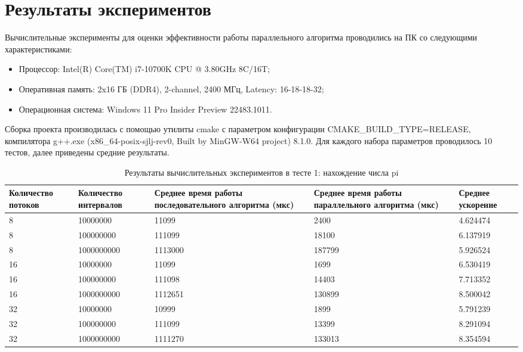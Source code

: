 \documentclass{report}
\begin{document}
\section*{Результаты экспериментов}
\par Вычислительные эксперименты для оценки эффективности работы параллельного алгоритма проводились на ПК со следующими характеристиками:
\begin{itemize}
\item Процессор: Intel(R) Core(TM) i7-10700K CPU @ 3.80GHz 8C/16T;
\item Оперативная память: 2x16 ГБ (DDR4), 2-channel, 2400 МГц, Latency: 16-18-18-32;
\item Операционная система: Windows 11 Pro Insider Preview 22483.1011.
\end{itemize}
\par Сборка проекта производилась с помощью утилиты cmake с параметром конфигурации CMAKE\_BUILD\_TYPE=RELEASE, компилятора g++.exe (x86\_64-posix-sjlj-rev0, Built by MinGW-W64 project) 8.1.0. Для каждого набора параметров проводилось 10 тестов, далее приведены средние результаты.
\begin{table}[H]
\caption{Результаты вычислительных экспериментов в тесте 1: нахождение числа pi}
\centering
\begin{tabular}{| m{2cm} | m{2cm} | m{4.5cm} | m{4.5cm} | m{2cm} |}
\toprule
Количество потоков & Количество интервалов & Среднее время работы последовательного алгоритма (мкс) & Среднее время работы параллельного алгоритма (мкс) & Среднее ускорение  \\
\midrule
8  & 10000000   & 11099   & 2400   & 4.624474 \\
8  & 100000000  & 111099  & 18100  & 6.137919 \\
8  & 1000000000 & 1113000 & 187799 & 5.926524 \\
16 & 10000000   & 11099   & 1699   & 6.530419 \\
16 & 100000000  & 111098  & 14403  & 7.713352 \\
16 & 1000000000 & 1112651 & 130899 & 8.500042 \\
32 & 10000000   & 10999   & 1899   & 5.791239 \\
32 & 100000000  & 111099  & 13399  & 8.291094 \\
32 & 1000000000 & 1111270 & 133013 & 8.354594 \\
\bottomrule
\end{tabular}
\end{table}
\end{document}
